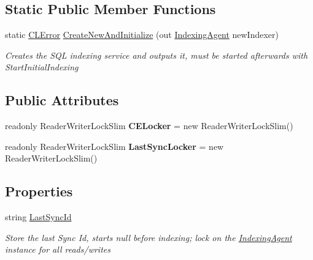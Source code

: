 \subsection*{Static Public Member Functions}
\begin{DoxyCompactItemize}
\item 
static \hyperlink{class_cloud_api_public_1_1_model_1_1_c_l_error}{C\-L\-Error} \hyperlink{class_s_q_l_indexer_1_1_indexing_agent_a5ef1a7410b870970331986996efadcd6}{Create\-New\-And\-Initialize} (out \hyperlink{class_s_q_l_indexer_1_1_indexing_agent}{Indexing\-Agent} new\-Indexer)
\begin{DoxyCompactList}\small\item\em Creates the S\-Q\-L indexing service and outputs it, must be started afterwards with Start\-Initial\-Indexing \end{DoxyCompactList}\end{DoxyCompactItemize}
\subsection*{Public Attributes}
\begin{DoxyCompactItemize}
\item 
\hypertarget{class_s_q_l_indexer_1_1_indexing_agent_a911db9610dda4cdc8fb2b361ccf40ffc}{readonly Reader\-Writer\-Lock\-Slim {\bfseries C\-E\-Locker} = new Reader\-Writer\-Lock\-Slim()}\label{class_s_q_l_indexer_1_1_indexing_agent_a911db9610dda4cdc8fb2b361ccf40ffc}

\item 
\hypertarget{class_s_q_l_indexer_1_1_indexing_agent_a65b1f9bbee5d85e40d16fd91ee5df623}{readonly Reader\-Writer\-Lock\-Slim {\bfseries Last\-Sync\-Locker} = new Reader\-Writer\-Lock\-Slim()}\label{class_s_q_l_indexer_1_1_indexing_agent_a65b1f9bbee5d85e40d16fd91ee5df623}

\end{DoxyCompactItemize}
\subsection*{Properties}
\begin{DoxyCompactItemize}
\item 
string \hyperlink{class_s_q_l_indexer_1_1_indexing_agent_a28454d94bac1c6abe5e7ece3b56c8b00}{Last\-Sync\-Id}
\begin{DoxyCompactList}\small\item\em Store the last Sync Id, starts null before indexing; lock on the \hyperlink{class_s_q_l_indexer_1_1_indexing_agent}{Indexing\-Agent} instance for all reads/writes \end{DoxyCompactList}\end{DoxyCompactItemize}


